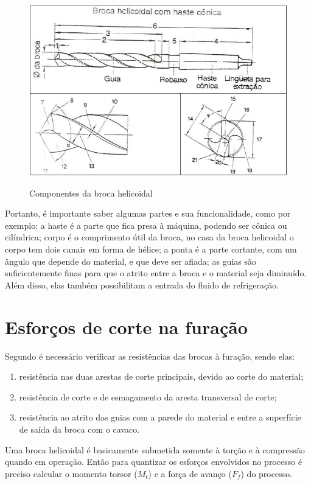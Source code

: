 \documentclass[deposito, acronym, symbols]{fei}
\begin{document}
\begin{figure}[!htp]
    \centering
    \caption{Componentes da broca helicoidal}
    \includegraphics[width=0.7\linewidth]{Imagens/broca helicoidal.png}
    \label{fig:broca}
\end{figure}

Portanto, é importante saber algumas partes e sua funcionalidade, como por exemplo: a haste é a parte que fica presa à máquina, podendo ser cônica ou cilíndrica; corpo é o comprimento útil da broca, no casa da broca helicoidal o corpo tem dois canais em forma de hélice; a ponta é a parte cortante, com um ângulo que depende do material, e que deve ser afiada; as guias são suficientemente finas para que o atrito entre a broca e o material seja diminuído. Além disso, elas também possibilitam a entrada do fluido de refrigeração.


\section{Esforços de corte na furação}

Segundo \textcite{diniz2002tecmat} é necessário verificar as resistências das brocas à furação, sendo elas:
\begin{enumerate}
    \item resistência nas duas arestas de corte principais, devido ao corte do material;
    \item resistência de corte e de esmagamento da aresta transversal de corte;
    \item resistência ao atrito das guias com a parede do material e entre a superfície de saída da broca com o cavaco.
\end{enumerate}

Uma broca helicoidal é basicamente submetida somente à torção e à compressão quando em operação. Então para quantizar os esforços envolvidos no processo é preciso calcular o momento torsor ($M_t$) e a força de avanço ($F_f$) do processo. 
\end{document}
